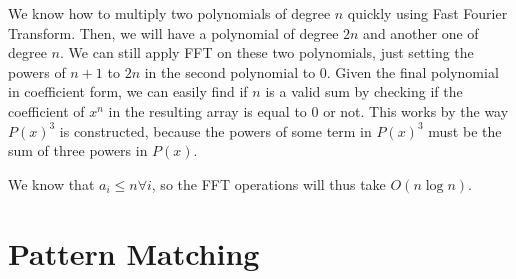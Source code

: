 \documentclass{article}
\begin{document}
We know how to multiply two polynomials of degree $n$ quickly using Fast Fourier Transform. Then, we will have a polynomial of degree $2n$ and another one of degree $n$. We can still apply FFT on these two polynomials, just setting the powers of $n+1$ to $2n$ in the second polynomial to $0$. Given the final polynomial in coefficient form, we can easily find if $n$ is a valid sum by checking if the coefficient of $x^n$ in the resulting array is equal to $0$ or not. This works by the way $P(x)^3$ is constructed, because the powers of some term in $P(x)^3$ must be the sum of three powers in $P(x)$.

We know that $a_i \leq n \forall i$, so the FFT operations will thus take $O(n \log n)$. 

\newpage 
\section{Pattern Matching}
\end{document}
